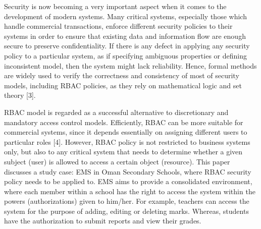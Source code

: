 Security is now becoming a very important aspect when it comes to the development of modern systems. Many critical systems, especially those which handle commercial transactions, enforce different security policies to their systems in order to ensure that existing data and information flow are enough secure to preserve confidentiality. If there is any defect in applying any security policy to a particular system, as if specifying ambiguous properties or defining inconsistent model, then the system might lack reliability. Hence, formal methods are widely used to verify the correctness and consistency of most of security models, including \ac{RBAC} policies, as they rely on mathematical logic and set theory [3].

RBAC model is regarded as a successful alternative to discretionary and mandatory access control models.  Efficiently, \ac{RBAC} can be more suitable for commercial systems, since it depends essentially on assigning different users to particular roles [4]. However, \ac{RBAC} policy is not restricted to business systems only, but also to any critical system that needs to determine whether a given subject (user) is allowed to access a certain object (resource). 
This paper discusses a study case: \ac{EMS} in Oman Secondary Schools, where \ac{RBAC} security policy needs to be applied to.  EMS aims to provide a consolidated environment, where each member within a school has the right to access the system within the powers (authorizations) given to him/her. For example, teachers can access the system for the purpose of adding, editing or deleting marks.  Whereas, students have the authorization to submit reports and view their grades.
